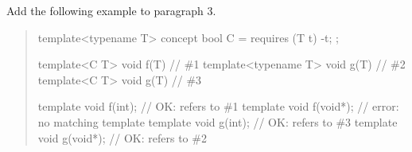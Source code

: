 Add the following example to paragraph 3.

\begin{quote}
\enterexample
\begin{codeblock}
template<typename T> concept bool C = requires (T t) { -t; };

template<C T>        void f(T) { } // \#1
template<typename T> void g(T) { } // \#2
template<C T>        void g(T) { } // \#3

template void f(int);   // OK: refers to \#1
template void f(void*); // error: no matching template
template void g(int);   // OK: refers to \#3
template void g(void*); // OK: refers to \#2
\end{codeblock}
\exitexample
\end{quote}
